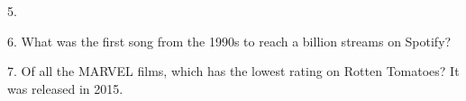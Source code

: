 \begin{frame}
\begin{center}
\Large
5. 
\end{center}
\end{frame}
\begin{frame}
\begin{center}
\Large
6. What was the first song from the 1990s to reach a billion streams on Spotify?
\\
\end{center}
\end{frame}
\begin{frame}
\begin{center}
\Large
7. Of all the MARVEL films, which has the lowest rating on Rotten Tomatoes? It was released in 2015.
\\
\\
\end{center}
\end{frame}
